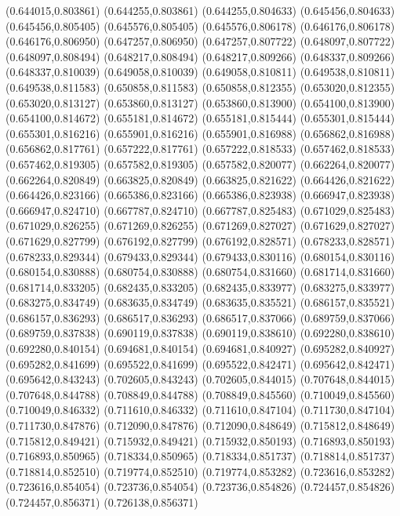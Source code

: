 (0.644015,0.803861)
(0.644255,0.803861)
(0.644255,0.804633)
(0.645456,0.804633)
(0.645456,0.805405)
(0.645576,0.805405)
(0.645576,0.806178)
(0.646176,0.806178)
(0.646176,0.806950)
(0.647257,0.806950)
(0.647257,0.807722)
(0.648097,0.807722)
(0.648097,0.808494)
(0.648217,0.808494)
(0.648217,0.809266)
(0.648337,0.809266)
(0.648337,0.810039)
(0.649058,0.810039)
(0.649058,0.810811)
(0.649538,0.810811)
(0.649538,0.811583)
(0.650858,0.811583)
(0.650858,0.812355)
(0.653020,0.812355)
(0.653020,0.813127)
(0.653860,0.813127)
(0.653860,0.813900)
(0.654100,0.813900)
(0.654100,0.814672)
(0.655181,0.814672)
(0.655181,0.815444)
(0.655301,0.815444)
(0.655301,0.816216)
(0.655901,0.816216)
(0.655901,0.816988)
(0.656862,0.816988)
(0.656862,0.817761)
(0.657222,0.817761)
(0.657222,0.818533)
(0.657462,0.818533)
(0.657462,0.819305)
(0.657582,0.819305)
(0.657582,0.820077)
(0.662264,0.820077)
(0.662264,0.820849)
(0.663825,0.820849)
(0.663825,0.821622)
(0.664426,0.821622)
(0.664426,0.823166)
(0.665386,0.823166)
(0.665386,0.823938)
(0.666947,0.823938)
(0.666947,0.824710)
(0.667787,0.824710)
(0.667787,0.825483)
(0.671029,0.825483)
(0.671029,0.826255)
(0.671269,0.826255)
(0.671269,0.827027)
(0.671629,0.827027)
(0.671629,0.827799)
(0.676192,0.827799)
(0.676192,0.828571)
(0.678233,0.828571)
(0.678233,0.829344)
(0.679433,0.829344)
(0.679433,0.830116)
(0.680154,0.830116)
(0.680154,0.830888)
(0.680754,0.830888)
(0.680754,0.831660)
(0.681714,0.831660)
(0.681714,0.833205)
(0.682435,0.833205)
(0.682435,0.833977)
(0.683275,0.833977)
(0.683275,0.834749)
(0.683635,0.834749)
(0.683635,0.835521)
(0.686157,0.835521)
(0.686157,0.836293)
(0.686517,0.836293)
(0.686517,0.837066)
(0.689759,0.837066)
(0.689759,0.837838)
(0.690119,0.837838)
(0.690119,0.838610)
(0.692280,0.838610)
(0.692280,0.840154)
(0.694681,0.840154)
(0.694681,0.840927)
(0.695282,0.840927)
(0.695282,0.841699)
(0.695522,0.841699)
(0.695522,0.842471)
(0.695642,0.842471)
(0.695642,0.843243)
(0.702605,0.843243)
(0.702605,0.844015)
(0.707648,0.844015)
(0.707648,0.844788)
(0.708849,0.844788)
(0.708849,0.845560)
(0.710049,0.845560)
(0.710049,0.846332)
(0.711610,0.846332)
(0.711610,0.847104)
(0.711730,0.847104)
(0.711730,0.847876)
(0.712090,0.847876)
(0.712090,0.848649)
(0.715812,0.848649)
(0.715812,0.849421)
(0.715932,0.849421)
(0.715932,0.850193)
(0.716893,0.850193)
(0.716893,0.850965)
(0.718334,0.850965)
(0.718334,0.851737)
(0.718814,0.851737)
(0.718814,0.852510)
(0.719774,0.852510)
(0.719774,0.853282)
(0.723616,0.853282)
(0.723616,0.854054)
(0.723736,0.854054)
(0.723736,0.854826)
(0.724457,0.854826)
(0.724457,0.856371)
(0.726138,0.856371)
